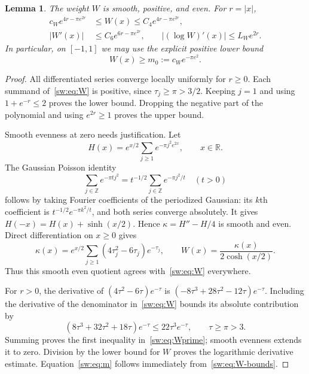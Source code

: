 \documentclass[11pt,a4paper]{article}
\numberwithin{equation}{section}
\newtheorem{lemma}[theorem]{Lemma}
\theoremstyle{definition}\newtheorem{definition}[theorem]{Definition}
\theoremstyle{remark}\newtheorem{remark}[theorem]{Remark}
\newcommand{\R}{\mathbb R}\newcommand{\C}{\mathbb C}\newcommand{\N}{\mathbb N}
\begin{document}
\begin{lemma}\label{sw:lem:theta}
The weight $W$ is smooth, positive, and even. For $r=|x|$,
\begin{align}
 c_We^{4r-\pi e^{2r}}&\le W(x)\le C_4e^{4r-\pi e^{2r}},\label{sw:eq:W-bounds}\\
 |W'(x)|&\le C_6e^{6r-\pi e^{2r}},\qquad
 |(\log W)'(x)|\le L_We^{2r}.\label{sw:eq:Wprime}
\end{align}
In particular, on $[-1,1]$ we may use the explicit positive lower bound
\begin{equation}\label{sw:eq:m}
 W(x)\ge m_0:=c_We^{-\pi e^2}.
\end{equation}
\end{lemma}
\begin{proof}
All differentiated series converge locally uniformly for $r\ge0$. Each summand of~\eqref{sw:eq:W} is positive, since $\tau_j\ge\pi>3/2$. Keeping $j=1$ and using $1+e^{-r}\le2$ proves the lower bound. Dropping the negative part of the polynomial and using $e^{2r}\ge1$ proves the upper bound.

Smooth evenness at zero needs justification. Let
\[
 H(x)=e^{x/2}\sum_{j\ge1}e^{-\pi j^2e^{2x}},\qquad x\in\R.
\]
The Gaussian Poisson identity
\[
 \sum_{j\in\mathbb Z}e^{-\pi t j^2}
   =t^{-1/2}\sum_{j\in\mathbb Z}e^{-\pi j^2/t}\quad(t>0)
\]
follows by taking Fourier coefficients of the periodized Gaussian: its $k$th coefficient is $t^{-1/2}e^{-\pi k^2/t}$, and both series converge absolutely. It gives $H(-x)=H(x)+\sinh(x/2)$. Hence $\kappa=H''-H/4$ is smooth and even. Direct differentiation on $x\ge0$ gives
\[
 \kappa(x)=e^{x/2}\sum_{j\ge1}(4\tau_j^2-6\tau_j)e^{-\tau_j},
 \qquad W(x)=\frac{\kappa(x)}{2\cosh(x/2)}.
\]
Thus this smooth even quotient agrees with~\eqref{sw:eq:W} everywhere.

For $r>0$, the derivative of $(4\tau^2-6\tau)e^{-\tau}$ is
$(-8\tau^3+28\tau^2-12\tau)e^{-\tau}$. Including the derivative of the denominator in~\eqref{sw:eq:W} bounds its absolute contribution by
\[
 (8\tau^3+32\tau^2+18\tau)e^{-\tau}\le22\tau^3e^{-\tau},
 \qquad \tau\ge\pi>3.
\]
Summing proves the first inequality in~\eqref{sw:eq:Wprime}; smooth evenness extends it to zero. Division by the lower bound for $W$ proves the logarithmic derivative estimate. Equation~\eqref{sw:eq:m} follows immediately from~\eqref{sw:eq:W-bounds}.
\end{proof}
\end{document}
